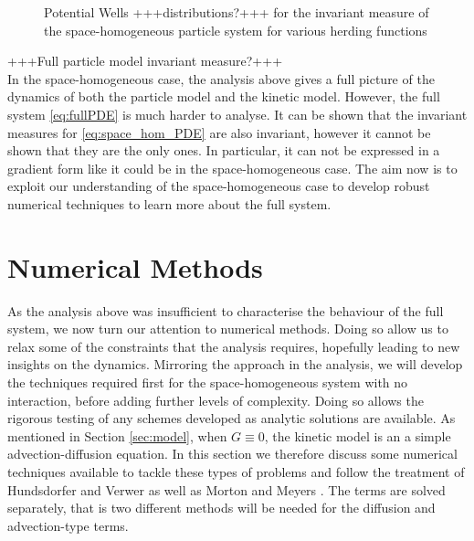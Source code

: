 \documentclass[11pt, a4paper, draft]{article}
\begin{document}
        \begin{figure}[h!]
            \centering
            \caption{Potential Wells +++distributions?+++ for the invariant measure of the space-homogeneous particle system for various herding functions}
            \label{fig:space_hom_particle_measure}
        \end{figure}
        +++Full particle model invariant measure?+++\\
        In the space-homogeneous case, the analysis above gives a full picture of the dynamics of both the particle model and the kinetic model. However, the full system \eqref{eq:fullPDE} is much harder to analyse. It can be shown that the invariant measures for \eqref{eq:space_hom_PDE} are also invariant, however it cannot be shown that they are the only ones. In particular, it can not be expressed in a gradient form like it could be in the space-homogeneous case. The aim now is to exploit our understanding of the space-homogeneous case to develop robust numerical techniques to learn more about the full system.
        
                
	\section{Numerical Methods}\label{sec:numericalmethods}
		As the analysis above was insufficient to characterise the behaviour of the full system, we now turn our attention to numerical methods. Doing so allow us to relax some of the constraints that the analysis requires, hopefully leading to new insights on the dynamics. Mirroring the approach in the analysis, we will develop the techniques required first for the space-homogeneous system with no interaction, before adding further levels of complexity. Doing so allows the rigorous testing of any schemes developed as analytic solutions are available. As mentioned in Section \ref{sec:model}, when $G\equiv0$, the kinetic model is an a simple advection-diffusion equation. In this section we therefore discuss some numerical techniques available to tackle these types of problems and follow the treatment of Hundsdorfer and Verwer as well as Morton and Meyers \cite{Hundsdorfer2007, Morton2005}. The terms are solved separately, that is two different methods will be needed for the diffusion and advection-type terms. 
        
\end{document}
